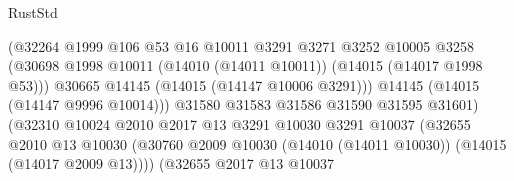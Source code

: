 \begin{lexlean}{RustStd}
\begin{coremodule}
                                            (@32264
                                              @1999
                                              @106
                                              @53
                                              @16
                                              @10011
                                              @3291
                                              @3271
                                              @3252
                                              @10005
                                              @3258
                                              (@30698
                                                @1998
                                                @10011
                                                (@14010 (@14011 @10011))
                                                (@14015 (@14017 @1998 @53)))
                                              @30665
                                              @14145
                                              (@14015 (@14147 @10006 @3291)))
                                            @14145
                                            (@14015 (@14147 @9996 @10014)))
                                          @31580
                                          @31583
                                          @31586
                                          @31590
                                          @31595
                                          @31601)
                                        (@32310
                                          @10024
                                          @2010
                                          @2017
                                          @13
                                          @3291
                                          @10030
                                          @3291
                                          @10037
                                          (@32655
                                            @2010
                                            @13
                                            @10030
                                            (@30760
                                              @2009
                                              @10030
                                              (@14010 (@14011 @10030))
                                              (@14015 (@14017 @2009 @13))))
                                          (@32655
                                            @2017
                                            @13
                                            @10037

\end{coremodule}
\end{lexlean}
